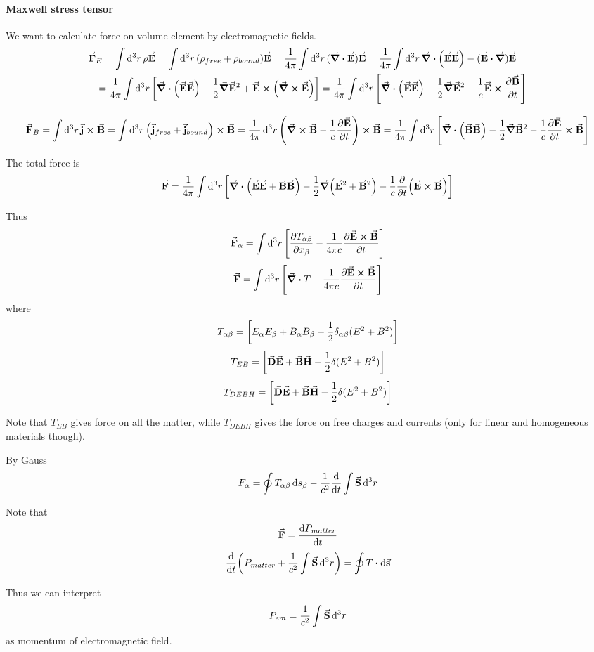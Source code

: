 \paragraph{Maxwell stress tensor}
We want to calculate force on volume element by electromagnetic fields.
\begin{align*}
\va{F}_E = \int \dd[3]{r} \rho \va{E}  = \int \dd[3]{r} \qty(\rho_{free}+\rho_{bound}) \va{E} = \frac{1}{4\pi} \int \dd[3]{r} (\div{\va{E}}) \va{E} = \frac{1}{4\pi} \int \dd[3]{r} \div(\va{E}\va{E}) - (\va{E} \vdot \grad)\va{E} =\\= \frac{1}{4\pi} \int \dd[3]{r} \qty[\div(\va{E}\va{E}) - \frac{1}{2}\grad\va{E}^2 + \va{E} \cross \qty(\curl{\va{E}}) ] = \frac{1}{4\pi} \int \dd[3]{r} \qty[\div(\va{E}\va{E}) - \frac{1}{2}\grad\va{E}^2 - \frac{1}{c}\va{E} \cross \pdv{\va{B}}{t}]
\end{align*}
$$$$
$$\va{F}_B = \int \dd[3]{r} \va{j} \cross \va{B}  = \int \dd[3]{r} \qty(\va{j}_{free}+\va{j}_{bound}) \cross \va{B} = \frac{1}{4\pi} \dd[3]{r} \qty(\curl{\va{B}} -\frac{1}{c}\pdv{\va{E}}{t} ) \cross{\va{B}} = \frac{1}{4\pi} \int \dd[3]{r} \qty[\div(\va{B} \va{B}) - \frac{1}{2}\grad{\va{B}^2} -\frac{1}{c}\pdv{\va{E}}{t} \cross \va{B} ]$$

The total force is
$$\va{F} = \frac{1}{4\pi} \int \dd[3]{r} \qty[\div(\va{E}\va{E}+\va{B} \va{B}) - \frac{1}{2}\grad(\va{E}^2+\va{B}^2 )- \frac{1}{c} \pdv{t} \qty(\va{E} \cross \va{B})]$$

Thus
$$\va{F}_\alpha= \int \dd[3]{r} \qty[\pdv{T_{\alpha \beta}}{x_\beta} - \frac{1}{4\pi c}\pdv{\va{E} \cross \va{B}}{t} ]$$
$$\va{F}= \int \dd[3]{r} \qty[\div{T} - \frac{1}{4\pi c}\pdv{\va{E} \cross \va{B}}{t} ]$$
where
$$T_{\alpha\beta} = \qty[E_\alpha E_\beta + B_\alpha B_\beta - \frac{1}{2}\delta_{\alpha \beta} (E^2+B^2) ]$$
$$T_{EB} = \qty[\va{D}\va{E} + \va{B}\va{H} - \frac{1}{2}\delta (E^2+B^2) ]$$
$$T_{DEBH} = \qty[\va{D}\va{E} + \va{B}\va{H} - \frac{1}{2}\delta (E^2+B^2) ]$$

Note that $T_{EB}$ gives force on all the matter, while $T_{DEBH}$ gives the force on free charges and currents (only for linear and homogeneous materials though).

By Gauss
$$F_\alpha = \oint T_{\alpha \beta} \dd{s_\beta} - \frac{1}{c^2} \dv{t} \int \va{S} \dd[3]{r}$$

Note that
$$\va{F} = \dv{P_{matter}}{t}$$
$$\dv{t} \qty(P_{matter}+\frac{1}{c^2} \int \va{S} \dd[3]{r}) = \oint T \vdot \dd{\va{s}}$$

Thus we can interpret 
$$P_{em} = \frac{1}{c^2} \int \va{S} \dd[3]{r}$$
as momentum of electromagnetic field.

